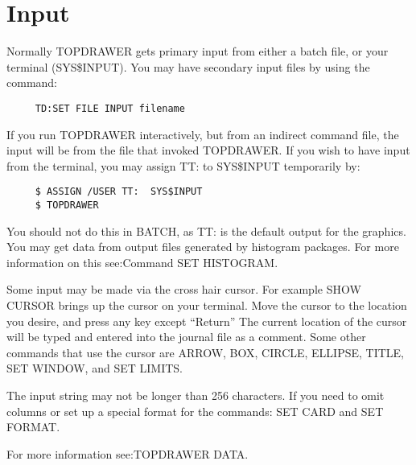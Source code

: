 \section{Input}
Normally  TOPDRAWER  gets  primary  input from either a batch file, or your
terminal (SYS\$INPUT).  You may have secondary  input  files  by  using  the
command:  
\begin{verbatim}
     TD:SET FILE INPUT filename 
\end{verbatim}

If  you run TOPDRAWER interactively, but from an indirect command file, the
input will be from the file that invoked TOPDRAWER.  If you  wish  to  have
input from the terminal, you may assign TT:  to SYS\$INPUT temporarily by:  
\begin{verbatim}
     $ ASSIGN /USER TT:  SYS$INPUT 
     $ TOPDRAWER 
\end{verbatim}

You  should  not  do  this  in BATCH, as TT:  is the default output for the
graphics.  You may get  data  from  output  files  generated  by  histogram
packages.  For more information on this see:Command SET HISTOGRAM.  

Some  input may be made via the cross hair cursor.  For example SHOW CURSOR
brings up the cursor on your terminal.  Move the cursor to the location you
desire,  and  press  any  key  except  ``Return'' The current location of the
cursor will be typed and entered into the journal file as a comment.   Some
other  commands that use the cursor are ARROW, BOX, CIRCLE, ELLIPSE, TITLE,
SET WINDOW, and SET LIMITS.  

The  input  string  may  not be longer than 256 characters.  If you need to
omit columns or set up a special format for  the  commands:   SET CARD  and
SET FORMAT.  

For more information see:TOPDRAWER DATA.  
